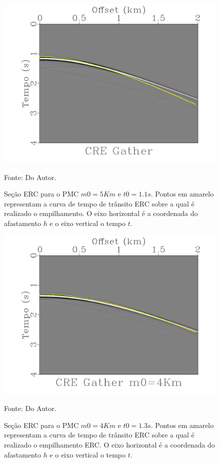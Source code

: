 \begin{figure}
\caption{Seção ERC para o PMC $m0=5Km$ e $t0=1.1s$.
Pontos em amarelo representam a curva de tempo de trânsito ERC sobre a qual
é realizado o empilhamento.
O eixo horizontal é a coordenada do afastamento $h$ e o eixo vertical o tempo
$t$.}
\begin{center}
\includegraphics[scale=0.3]{images/interpolacao5.jpeg}
\vspace{-0.3cm}
\end{center}
\begin{center}
 Fonte: Do Autor.
\end{center}
\label{fig:6.1}
\end{figure}

\begin{figure}
\caption{Seção ERC para o PMC $m0=4Km$ e $t0=1.3s$.
Pontos em amarelo representam a curva de tempo de trânsito ERC sobre a qual
é realizado o empilhamento ERC.
O eixo horizontal é a coordenada do afastamento $h$ e o eixo vertical o tempo
$t$.}
\begin{center}
\includegraphics[scale=0.3]{images/interpolacao4.jpeg}
\vspace{-0.3cm}
\end{center}
\begin{center}
 Fonte: Do Autor.
\end{center}
\label{fig:6.2}
\end{figure}

